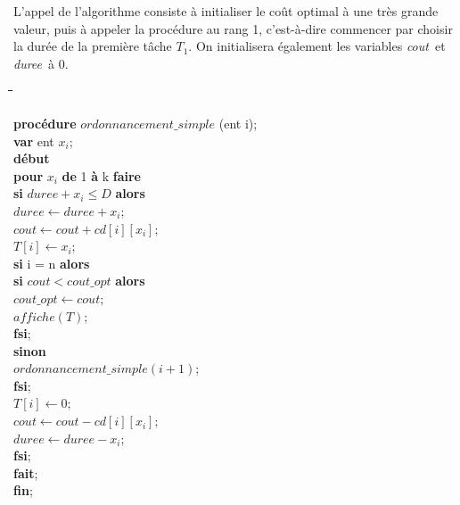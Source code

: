 \documentclass[a4paper, titlepage]{article}
\begin{document}
			L'appel de l'algorithme consiste à initialiser le coût optimal à une très grande valeur, puis à appeler la procédure au rang 1, c'est-à-dire commencer par choisir la durée de la première tâche $T_{1}$.
			On initialisera également les variables \emph{cout} et \emph{duree} à 0.

			\begin{tabbing}

			\hspace{1cm}\=\hspace{1cm}\=\hspace{1cm}\=\hspace{1cm}\=\hspace{1cm}\=\kill %

			\textbf{procédure} $ordonnancement\_simple$ (ent i); \\
			\textbf{var} ent $x_{i}$; \\
			\textbf{début} \\
			\> \textbf{pour} $x_{i}$ \textbf{de} 1 \textbf{à} k \textbf{faire} \\
			\>\> \textbf{si} $duree+x_{i}\le D$ \textbf{alors} \\
			\>\>\> $duree \leftarrow duree + x_{i};$ \\
			\>\>\> $cout \leftarrow cout + cd[i][x_{i}];$ \\
			\>\>\> $T[i] \leftarrow x_{i};$ \\

			\>\>\> \textbf{si} i = n \textbf{alors} \\
			\>\>\>\> \textbf{si} $cout < cout\_opt$ \textbf{alors} \\
			\>\>\>\>\> $cout\_opt \leftarrow cout$; \\
			\>\>\>\>\> $affiche(T)$; \\
			\>\>\>\> \textbf{fsi}; \\

			\>\>\> \textbf{sinon} \\
			\>\>\>\> $ordonnancement\_simple(i+1)$; \\
			\>\>\> \textbf{fsi}; \\

			\>\>\> $T[i] \leftarrow 0;$ \\
			\>\>\> $cout \leftarrow cout - cd[i][x_{i}];$ \\
			\>\>\> $duree \leftarrow duree - x_{i};	$ \\
			\>\> \textbf{fsi}; \\
			\> \textbf{fait}; \\
			\textbf{fin};

			\end{tabbing}
\end{document}
